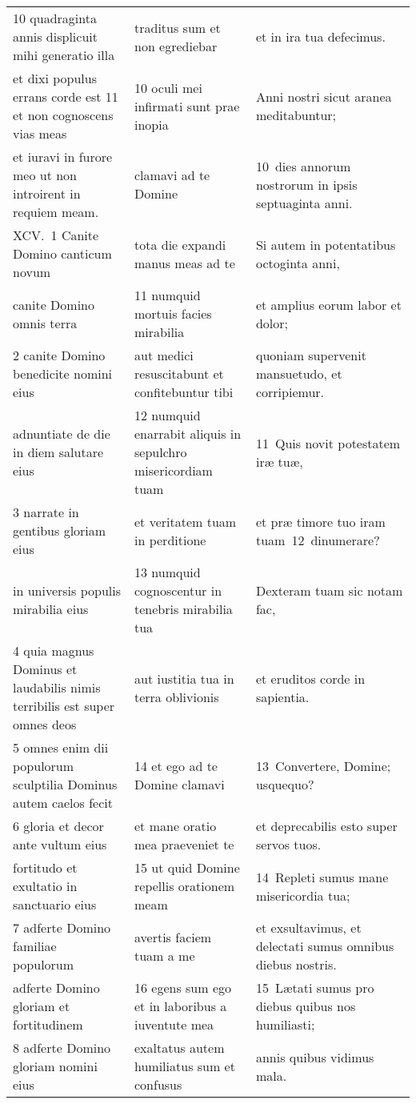 \documentclass{article}
\begin{document}
\begin{longtable}{@{}p{}p{}p{}@{}}
10 quadraginta annis displicuit mihi generatio illa	&	traditus sum et non egrediebar	&	et in ira tua defecimus.	\\
et dixi populus errans corde est 11 et non cognoscens vias meas	&	10 oculi mei infirmati sunt prae inopia	&	Anni nostri sicut aranea meditabuntur;	\\
et iuravi in furore meo ut non introirent in requiem meam.	&	clamavi ad te Domine	&	10 dies annorum nostrorum in ipsis septuaginta anni.	\\
XCV. 1 Canite Domino canticum novum	&	tota die expandi manus meas ad te	&	Si autem in potentatibus octoginta anni,	\\
canite Domino omnis terra	&	11 numquid mortuis facies mirabilia	&	et amplius eorum labor et dolor;	\\
2 canite Domino benedicite nomini eius	&	aut medici resuscitabunt et confitebuntur tibi	&	quoniam supervenit mansuetudo, et corripiemur.	\\
adnuntiate de die in diem salutare eius	&	12 numquid enarrabit aliquis in sepulchro misericordiam tuam	&	11 Quis novit potestatem iræ tuæ,	\\
3 narrate in gentibus gloriam eius	&	et veritatem tuam in perditione	&	et præ timore tuo iram tuam 12 dinumerare?	\\
in universis populis mirabilia eius	&	13 numquid cognoscentur in tenebris mirabilia tua	&	Dexteram tuam sic notam fac,	\\
4 quia magnus Dominus et laudabilis nimis terribilis est super omnes deos	&	aut iustitia tua in terra oblivionis	&	et eruditos corde in sapientia.	\\
5 omnes enim dii populorum sculptilia Dominus autem caelos fecit	&	14 et ego ad te Domine clamavi	&	13 Convertere, Domine; usquequo?	\\
6 gloria et decor ante vultum eius	&	et mane oratio mea praeveniet te	&	et deprecabilis esto super servos tuos.	\\
fortitudo et exultatio in sanctuario eius	&	15 ut quid Domine repellis orationem meam	&	14 Repleti sumus mane misericordia tua;	\\
7 adferte Domino familiae populorum	&	avertis faciem tuam a me	&	et exsultavimus, et delectati sumus omnibus diebus nostris.	\\
adferte Domino gloriam et fortitudinem	&	16 egens sum ego et in laboribus a iuventute mea	&	15 Lætati sumus pro diebus quibus nos humiliasti;	\\
8 adferte Domino gloriam nomini eius	&	exaltatus autem humiliatus sum et confusus	&	annis quibus vidimus mala.	\\

\end{longtable}
\end{document}
